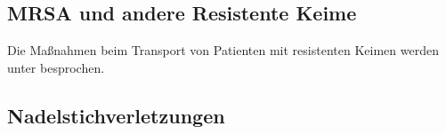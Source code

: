 \subsection{MRSA und andere Resistente Keime}

Die Maßnahmen beim Transport von Patienten mit resistenten Keimen
werden unter  besprochen.




\subsection{Nadelstichverletzungen}
\label{topic:nadelstichverletzung}



